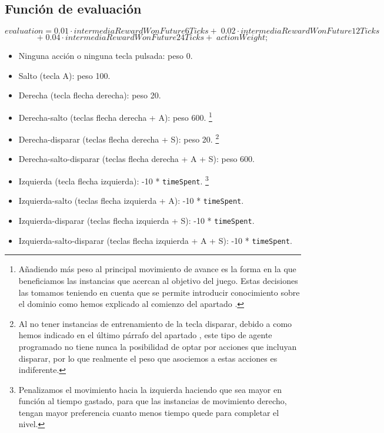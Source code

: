 \documentclass[10pt, spanish, pdftex]{../.template/template}
\newcommand*{\namerefs}[1]{\textit{\underline{\color{uc3mNewBlue}\nameref{#1}}}}
\begin{document}
    \subsection{Función de evaluación}\label{fe}
        \[ evaluation = 0.01 \cdot intermediaRewardWonFuture6Ticks + \; 0.02 \cdot intermediaRewardWonFuture12Ticks \]
        \[ + \; 0.04 \cdot intermediaRewardWonFuture24Ticks + \; actionWeight;\]
        \begin{itemize}
            \item Ninguna acción o ninguna tecla pulsada: peso 0.
            \item Salto (tecla A): peso 100.
            \item Derecha (tecla flecha derecha): peso 20.
            \item Derecha-salto (teclas flecha derecha + A): peso 600. \footnote{ Añadiendo más peso al principal movimiento de avance es la forma en la que beneficiamos las instancias que acercan al objetivo del juego. Estas decisiones las tomamos teniendo en cuenta que se permite introducir conocimiento sobre el dominio como hemos explicado al comienzo del apartado \namerefs{f}.}
            \item Derecha-disparar (teclas flecha derecha + S): peso 20. \footnote{ Al no tener instancias de entrenamiento de la tecla disparar, debido a como hemos indicado en el último párrafo del apartado \namerefs{esi}, este tipo de agente programado no tiene nunca la posibilidad de optar por acciones que incluyan disparar, por lo que realmente el peso que asociemos a estas acciones es indiferente.}
            \item Derecha-salto-disparar (teclas flecha derecha + A + S): peso 600.
            \item Izquierda (tecla flecha izquierda): -10 * \texttt{timeSpent}. \footnote{ Penalizamos el movimiento hacia la izquierda haciendo que sea mayor en función al tiempo gastado, para que las instancias de movimiento derecho, tengan mayor preferencia cuanto menos tiempo quede para completar el nivel.}
            \item Izquierda-salto (teclas flecha izquierda + A): -10 * \texttt{timeSpent}.
            \item Izquierda-disparar (teclas flecha izquierda + S): -10 * \texttt{timeSpent}.
            \item Izquierda-salto-disparar (teclas flecha izquierda + A + S): -10 * \texttt{timeSpent}.
        \end{itemize}
\end{document}

